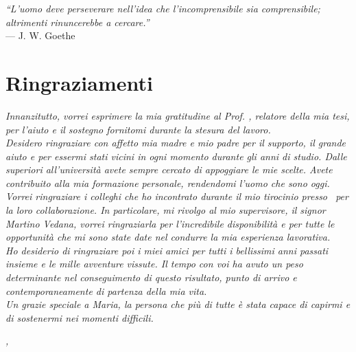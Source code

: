 
\cleardoublepage
{}
{}

\begin{flushright}{
	\slshape    
	``L’uomo deve perseverare nell'idea che l'incomprensibile sia comprensibile; altrimenti rinuncerebbe a cercare.''} \\ 
	\medskip
    --- J. W. Goethe
\end{flushright}


\bigskip

\begingroup
\let\clearpage\relax
\let\cleardoublepage\relax
\let\cleardoublepage\relax

\chapter*{Ringraziamenti}

\noindent \textit{Innanzitutto, vorrei esprimere la mia gratitudine al Prof. \myProf, relatore della mia tesi, per l'aiuto e il sostegno fornitomi durante la stesura del lavoro.}\\

\noindent \textit{Desidero ringraziare con affetto mia madre e mio padre per il supporto, il grande aiuto e per essermi stati vicini in ogni momento durante gli anni di studio. Dalle superiori all'università avete sempre cercato di appoggiare le mie scelte. Avete contribuito alla mia formazione personale, rendendomi l'uomo che sono oggi.}\\

\noindent \textit{Vorrei ringraziare i colleghi che ho incontrato durante il mio tirocinio presso \azienda\ per la loro collaborazione. In particolare, mi rivolgo al mio supervisore, il signor Martino Vedana, vorrei ringraziarla per l'incredibile disponibilità e per tutte le opportunità che mi sono state date nel condurre la mia esperienza lavorativa.}\\

\noindent \textit{Ho desiderio di ringraziare poi i miei amici per tutti i bellissimi anni passati insieme e le mille avventure vissute. Il tempo con voi ha avuto un peso determinante nel conseguimento di questo risultato, punto di arrivo e contemporaneamente di partenza della mia vita.}\\

\noindent \textit{Un grazie speciale a Maria, la persona che più di tutte è stata capace di capirmi e di sostenermi nei momenti difficili.}\\

\bigskip

\noindent\textit{\myLocation, \myTime}
\hfill \myName

\endgroup


